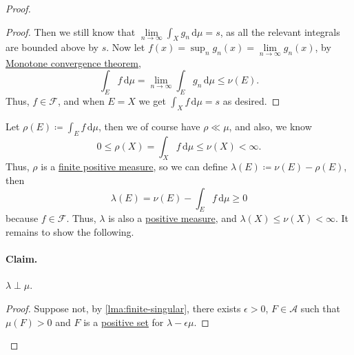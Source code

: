 \begin{proof}
\begin{enumerate}
\begin{mdframed}[skipabove=0.1in,skipbelow=0.1in]
\begin{proof}
				      Then we still know that \(\lim\limits_{n \to \infty} \int_X g_n \,\mathrm{d} \mu = s\), as all the relevant integrals are bounded above by \(s\).
				      Now let \(f(x) = \sup_n g_n(x) = \lim\limits_{n \to \infty} g_n(x)\), by \hyperref[thm:MCT]{Monotone convergence theorem},
				      \[
					      \int_E f \,\mathrm{d} \mu = \lim_{n \to \infty} \int_E g_n \,\mathrm{d} \mu \leq \nu(E).
				      \]
				      Thus, \(f \in \mathscr{F}\), and when \(E = X\) we get \(\int_X f \,\mathrm{d} \mu = s\) as desired.
			      \end{proof}
		      \end{mdframed}

		      Let \(\rho(E) \coloneqq \int_E f \,\mathrm{d} \mu\), then we of course have \(\rho \ll \mu\), and also, we know
		      \[
			      0 \leq \rho(X) = \int_X f \,\mathrm{d} \mu \leq \nu(X) < \infty.
		      \]
		      Thus, \(\rho\) is a \hyperref[def:finite-signed-measure]{finite positive measure}, so we can define \(\lambda(E) \coloneqq \nu(E) - \rho(E)\), then
		      \[
			      \lambda(E) = \nu(E) - \int_E f \,\mathrm{d} \mu \geq 0
		      \]
		      because \(f \in \mathscr{F}\). Thus, \(\lambda\) is also a \hyperref[def:signed-measure]{positive measure}, and \(\lambda(X) \leq \nu(X) < \infty\).
		      It remains to show the following.

		      \paragraph{Claim.} \(\lambda \perp \mu\).
		      \begin{mdframed}[skipabove=0.1in,skipbelow=0.1in]
			      \begin{proof}
				      Suppose not, by \autoref{lma:finite-singular}, there exists \(\epsilon > 0\), \(F \in \mathcal{A}\) such that \(\mu(F) > 0\) and \(F\) is a
				      \hyperref[def:positive-set-for-a-signed-measure]{positive set} for \(\lambda - \epsilon \mu\).


\end{proof}
\end{mdframed}
\end{enumerate}
\end{proof}
